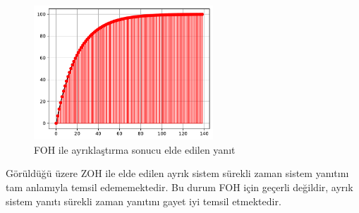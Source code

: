 \begin{figure}[!htb]
    \centering
    \includegraphics[width=0.6\textwidth]{q2.pdf}
    \caption{FOH ile ayrıklaştırma sonucu elde edilen yanıt}\label{fig:q2}
\end{figure}

Görüldüğü üzere ZOH ile elde edilen ayrık sistem sürekli zaman sistem yanıtını tam anlamıyla temsil edememektedir. Bu durum FOH için geçerli değildir, ayrık sistem yanıtı sürekli zaman yanıtını gayet iyi temsil etmektedir. 